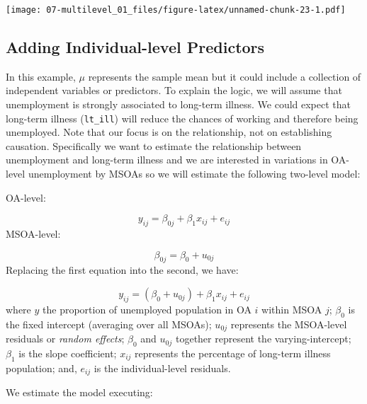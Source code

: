 \documentclass[
]{book}
\newenvironment{Shaded}{\begin{snugshade}}{\end{snugshade}}
\newcommand{\CommentTok}[1]{\textcolor[rgb]{0.56,0.35,0.01}{\textit{#1}}}
\newcommand{\DataTypeTok}[1]{\textcolor[rgb]{0.13,0.29,0.53}{#1}}
\newcommand{\DecValTok}[1]{\textcolor[rgb]{0.00,0.00,0.81}{#1}}
\newcommand{\KeywordTok}[1]{\textcolor[rgb]{0.13,0.29,0.53}{\textbf{#1}}}
\newcommand{\NormalTok}[1]{#1}
\newcommand{\OperatorTok}[1]{\textcolor[rgb]{0.81,0.36,0.00}{\textbf{#1}}}
\newcommand{\StringTok}[1]{\textcolor[rgb]{0.31,0.60,0.02}{#1}}
\begin{document}
\texttt{[image: 07-multilevel\_01\_files/figure-latex/unnamed-chunk-23-1.pdf]}

\hypertarget{adding-individual-level-predictors}{%
\subsection{Adding Individual-level Predictors}\label{adding-individual-level-predictors}}

In this example, \(\mu\) represents the sample mean but it could include a collection of independent variables or predictors. To explain the logic, we will assume that unemployment is strongly associated to long-term illness. We could expect that long-term illness (\texttt{lt\_ill}) will reduce the chances of working and therefore being unemployed. Note that our focus is on the relationship, not on establishing causation. Specifically we want to estimate the relationship between unemployment and long-term illness and we are interested in variations in OA-level unemployment by MSOAs so we will estimate the following two-level model:

OA-level:

\[y_{ij} = \beta_{0j} + \beta_{1}x_{ij} + e_{ij}\]
MSOA-level:

\[\beta_{0j} = \beta_{0} + u_{0j}\]
Replacing the first equation into the second, we have:

\[y_{ij} = (\beta_{0} + u_{0j}) + \beta_{1}x_{ij} + e_{ij}\]
where \(y\) the proportion of unemployed population in OA \(i\) within MSOA \(j\); \(\beta_{0}\) is the fixed intercept (averaging over all MSOAs); \(u_{0j}\) represents the MSOA-level residuals or \emph{random effects}; \(\beta_{0}\) and \(u_{0j}\) together represent the varying-intercept; \(\beta_{1}\) is the slope coefficient; \(x_{ij}\) represents the percentage of long-term illness population; and, \(e_{ij}\) is the individual-level residuals.

We estimate the model executing:

\begin{Shaded}
\end{Shaded}
\end{document}
